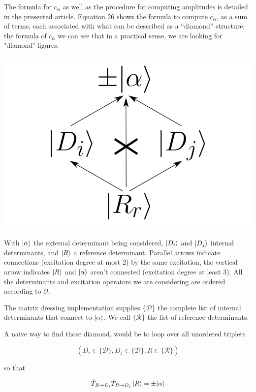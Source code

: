 \documentclass[./thesis.tex]{subfiles}
\begin{document}

The formula for $c_\alpha$ as well as the procedure for computing amplitudes is detailed in the presented article.
Equation 26 shows the formula to compute $c_\alpha$, as a sum of terms, each associated with what can be described as a ``diamond'' structure.
the formula of $c_\alpha$  we can see that in a practical sense, we are looking for "diamond" figures.

	\begin{center}
		\includegraphics[width=0.3\columnwidth]{figures/matrix_dressing/diamond}
	\end{center}

With ${\ket{\alpha}}$ the external determinant being considered, $\ket {D_i}$ and $\ket {D_j}$ internal determinants, and $\ket R$ a reference determinant.  Parallel arrows indicate connections (excitation degree at most 2) by the same excitation, the vertical arrow indicates $\ket R$ and ${\ket{\alpha}}$ aren't connected (excitation degree at least 3). All the determinants and excitation operators we are considering are ordered according to $\mathcal{O}$.

The matrix dressing implementation supplies $\{\mathcal{D}\}$ the complete list of internal determinants that connect to ${\ket{\alpha}}$. We call $\{\mathcal{R}\}$ the list of reference determinants.

A naive way to find those diamond, would be to loop over all unordered triplets 

\begin{equation}
(D_i \in \{\mathcal{D}\}, D_j \in \{\mathcal{D}\}, R \in \{\mathcal{R}\})
\end{equation}

so that

\begin{equation}
\hat T_{R \rightarrow D_i} \hat T_{R \rightarrow D_j} \ket R = \pm {\ket{\alpha}}
\end{equation}
\end{document}
